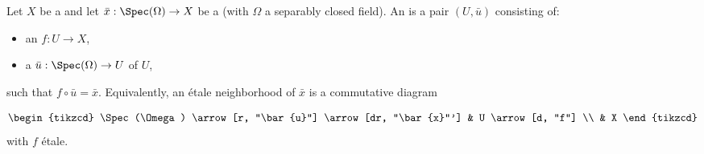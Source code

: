 \begin{definition} \label{definition:etale_neighborhood_of_a_geometric_point_on_a_scheme}
Let $X$ be a  and let $\bar{x} : \Spec(\Omega) \to X$ be a  (with $\Omega$ a separably closed field).
An  is a pair $(U, \bar{u})$ consisting of:
\begin{itemize}
    \item an  $f : U \to X$,
    \item a  $\bar{u} : \Spec(\Omega) \to U$ of $U$,
\end{itemize}
such that $f \circ \bar{u} = \bar{x}$.
Equivalently, an \'etale neighborhood of $\bar{x}$ is a commutative diagram

$$
\begin{tikzcd}
\Spec(\Omega) \arrow[r, "\bar{u}"] \arrow[dr, "\bar{x}"'] & U \arrow[d, "f"] \\
& X
\end{tikzcd}
$$
with $f$ \'etale.
\end{definition}